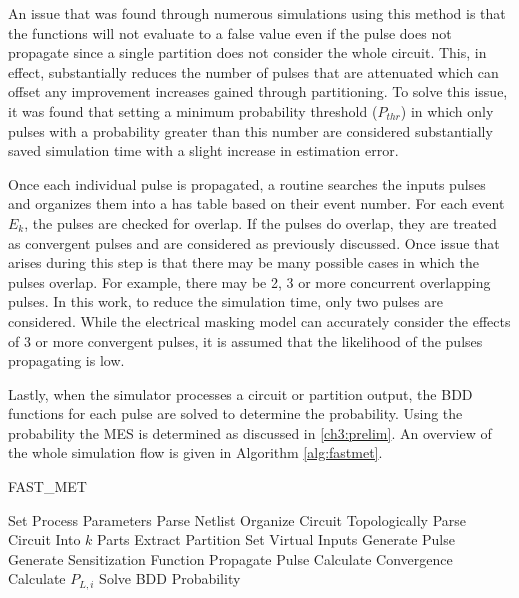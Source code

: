 An issue that was found through numerous simulations using this method is that the functions will not evaluate to a false value even if the pulse does not propagate since a single partition does not consider the whole circuit. This, in effect, substantially reduces the number of pulses that are attenuated which can offset any improvement increases gained through partitioning. To solve this issue, it was found that setting a minimum probability threshold ($P_{thr}$) in which only pulses with a probability greater than this number are considered substantially saved simulation time with a slight increase in estimation error.

Once each individual pulse is propagated, a routine searches the inputs pulses and organizes them into a has table based on their event number. For each event $E_k$, the pulses are checked for overlap. If the pulses do overlap, they are treated as convergent pulses and are considered as previously discussed. Once issue that arises during this step is that there may be many possible cases in which the pulses overlap. For example, there may be 2, 3 or more concurrent overlapping pulses. In this work, to reduce the simulation time, only two pulses are considered. While the electrical masking model can accurately consider the effects of 3 or more convergent pulses, it is assumed that the likelihood of the pulses propagating is low.

Lastly, when the simulator processes a circuit or partition output, the BDD functions for each pulse are solved to determine the probability. Using the probability the MES is determined as discussed in \ref{ch3:prelim}. An overview of the whole simulation flow is given in Algorithm \ref{alg:fastmet}.

\begin{algorithm}
	\caption{FAST\_MET} \label{alg:fastmet}
	\begin{algorithmic} [1]
		\STATE Set Process Parameters
		\STATE Parse Netlist
		\STATE Organize Circuit Topologically
		\STATE Parse Circuit Into $k$ Parts
			\STATE Extract Partition
			\STATE Set Virtual Inputs
				\STATE Generate Pulse
				\STATE Generate Sensitization Function
				\STATE Propagate Pulse
				\STATE Calculate Convergence
					\STATE Calculate $P_{L,i}$
					\STATE Solve BDD Probability
				\ENDIF
			\ENDFOR
		\ENDFOR		
	\end{algorithmic}
\end{algorithm}

